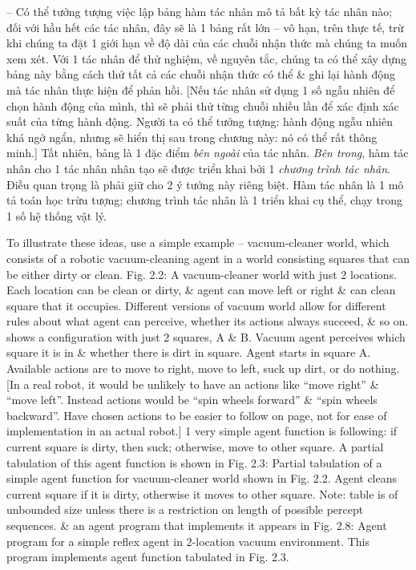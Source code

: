 \documentclass{article}
\begin{document}
\begin{itemize}
\begin{itemize}
\begin{itemize}
			-- Có thể tưởng tượng việc lập bảng hàm tác nhân mô tả bất kỳ tác nhân nào; đối với hầu hết các tác nhân, đây sẽ là 1 bảng rất lớn -- vô hạn, trên thực tế, trừ khi chúng ta đặt 1 giới hạn về độ dài của các chuỗi nhận thức mà chúng ta muốn xem xét. Với 1 tác nhân để thử nghiệm, về nguyên tắc, chúng ta có thể xây dựng bảng này bằng cách thử tất cả các chuỗi nhận thức có thể \& ghi lại hành động mà tác nhân thực hiện để phản hồi. [Nếu tác nhân sử dụng 1 số ngẫu nhiên để chọn hành động của mình, thì sẽ phải thử từng chuỗi nhiều lần để xác định xác suất của từng hành động. Người ta có thể tưởng tượng: hành động ngẫu nhiên khá ngớ ngẩn, nhưng sẽ hiển thị sau trong chương này: nó có thể rất thông minh.] Tất nhiên, bảng là 1 đặc điểm {\it bên ngoài} của tác nhân. {\it Bên trong}, hàm tác nhân cho 1 tác nhân nhân tạo sẽ được triển khai bởi 1 {\it chương trình tác nhân}. Điều quan trọng là phải giữ cho 2 ý tưởng này riêng biệt. Hàm tác nhân là 1 mô tả toán học trừu tượng; chương trình tác nhân là 1 triển khai cụ thể, chạy trong 1 số hệ thống vật lý.

			To illustrate these ideas, use a simple example -- vacuum-cleaner world, which consists of a robotic vacuum-cleaning agent in a world consisting squares that can be either dirty or clean. {\sf Fig. 2.2: A vacuum-cleaner world with just 2 locations. Each location can be clean or dirty, \& agent can move left or right \& can clean square that it occupies. Different versions of vacuum world allow for different rules about what agent can perceive, whether its actions always succeed, \& so on.} shows a configuration with just 2 squares, A \& B. Vacuum agent perceives which square it is in \& whether there is dirt in square. Agent starts in square A. Available actions are to move to right, move to left, suck up dirt, or do nothing. [In a real robot, it would be unlikely to have an actions like ``move right'' \& ``move left''. Instead actions would be ``spin wheels forward'' \& ``spin wheels backward''. Have chosen actions to be easier to follow on page, not for ease of implementation in an actual robot.] 1 very simple agent function is following: if current square is dirty, then suck; otherwise, move to other square. A partial tabulation of this agent function is shown in {\sf Fig. 2.3: Partial tabulation of a simple agent function for vacuum-cleaner world shown in Fig. 2.2. Agent cleans current square if it is dirty, otherwise it moves to other square. Note: table is of unbounded size unless there is a restriction on length of possible percept sequences.} \& an agent program that implements it appears in {\sf Fig. 2.8: Agent program for a simple reflex agent in 2-location vacuum environment. This program implements agent function tabulated in Fig. 2.3.}


\end{itemize}
\end{itemize}
\end{itemize}
\end{document}
